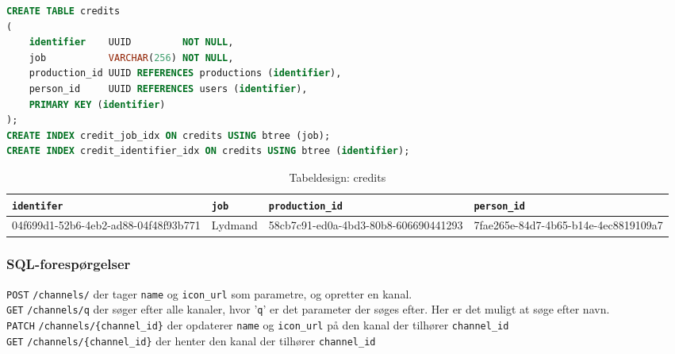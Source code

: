
\begin{lstlisting}[language=sql, caption=credits.sql]
CREATE TABLE credits
(
    identifier    UUID         NOT NULL,
    job           VARCHAR(256) NOT NULL,
    production_id UUID REFERENCES productions (identifier),
    person_id     UUID REFERENCES users (identifier),
    PRIMARY KEY (identifier)
);
CREATE INDEX credit_job_idx ON credits USING btree (job);
CREATE INDEX credit_identifier_idx ON credits USING btree (identifier);
\end{lstlisting}


\begin{table}[ht]
    \begin{tabularx}{\textwidth}{|X|X|X|X|}
        \hline
        \texttt{\textbf{identifer}} &  \texttt{\textbf{job}} & \texttt{\textbf{production\_id}} & \texttt{\textbf{person\_id}}\\
        \hline
        04f699d1-52b6-4eb2-ad88-04f48f93b771 & Lydmand & 58cb7c91-ed0a-4bd3-80b8-606690441293 & 7fae265e-84d7-4b65-b14e-4ec8819109a7\\
        \hline
    \end{tabularx}
    \caption{Tabeldesign: credits}
    \label{tab:credits_table}
\end{table}

\subsubsection{SQL-forespørgelser}
\texttt{POST} \texttt{/channels/} der tager \texttt{name} og \texttt{icon\_url} som parametre, og opretter en kanal.\\


\texttt{GET} \texttt{/channels/q} der søger efter alle kanaler, hvor '\texttt{q}' er det parameter der søges efter. Her er det muligt at søge efter navn.\\


\texttt{PATCH} \texttt{/channels/\{channel\_id\}} der opdaterer \texttt{name} og \texttt{icon\_url} på den kanal der tilhører \texttt{channel\_id}\\


\texttt{GET} \texttt{/channels/\{channel\_id\}} der henter den kanal der tilhører \texttt{channel\_id}\\


